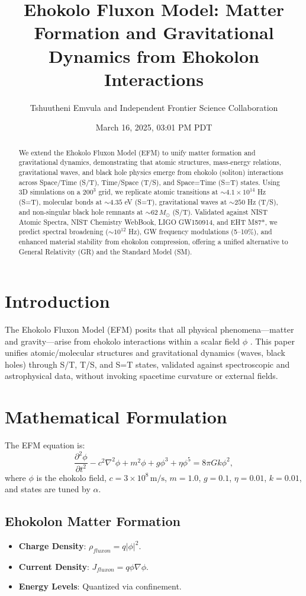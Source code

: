 \documentclass{article}
\title{Ehokolo Fluxon Model: Matter Formation and Gravitational Dynamics from Ehokolon Interactions}
\author{Tshuutheni Emvula and Independent Frontier Science Collaboration}
\date{March 16, 2025, 03:01 PM PDT}
\begin{document}
\maketitle

\begin{abstract}
We extend the Ehokolo Fluxon Model (EFM) to unify matter formation and gravitational dynamics, demonstrating that atomic structures, mass-energy relations, gravitational waves, and black hole physics emerge from ehokolo (soliton) interactions across Space/Time (S/T), Time/Space (T/S), and Space=Time (S=T) states. Using 3D simulations on a $200^3$ grid, we replicate atomic transitions at $\sim 4.1 \times 10^{14}$ Hz (S=T), molecular bonds at $\sim 4.35$ eV (S=T), gravitational waves at $\sim 250$ Hz (T/S), and non-singular black hole remnants at $\sim 62 \, M_\odot$ (S/T). Validated against NIST Atomic Spectra, NIST Chemistry WebBook, LIGO GW150914, and EHT M87*, we predict spectral broadening ($\sim 10^{12}$ Hz), GW frequency modulations (5–10\%), and enhanced material stability from ehokolon compression, offering a unified alternative to General Relativity (GR) and the Standard Model (SM).
\end{abstract}

\section{Introduction}
The Ehokolo Fluxon Model (EFM) posits that all physical phenomena—matter and gravity—arise from ehokolo interactions within a scalar field \(\phi\) \cite{emvula2025foundation}. This paper unifies atomic/molecular structures and gravitational dynamics (waves, black holes) through S/T, T/S, and S=T states, validated against spectroscopic and astrophysical data, without invoking spacetime curvature or external fields.

\section{Mathematical Formulation}
The EFM equation is:
\begin{equation}
\frac{\partial^2 \phi}{\partial t^2} - c^2 \nabla^2 \phi + m^2 \phi + g \phi^3 + \eta \phi^5 = 8 \pi G k \phi^2,
\end{equation}
where \(\phi\) is the ehokolo field, \(c = 3 \times 10^8 \, \text{m/s}\), \(m = 1.0\), \(g = 0.1\), \(\eta = 0.01\), \(k = 0.01\), and states are tuned by \(\alpha\).

\subsection{Ehokolon Matter Formation}
\begin{itemize}
    \item \textbf{Charge Density}: \(\rho_{fluxon} = q |\phi|^2\).
    \item \textbf{Current Density}: \(J_{fluxon} = q \phi \nabla \phi\).
    \item \textbf{Energy Levels}: Quantized via confinement.
\end{itemize}
\end{document}
